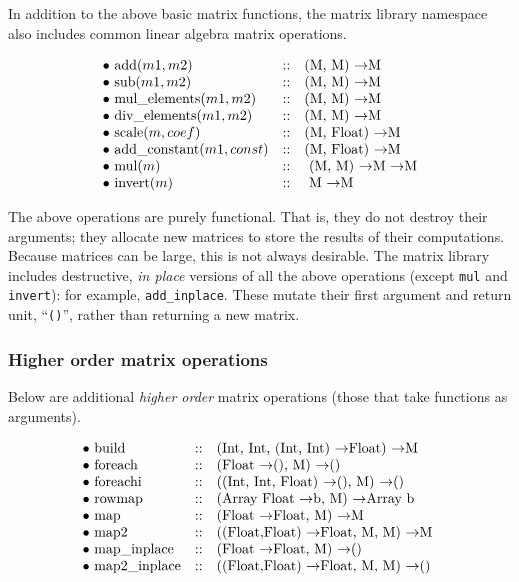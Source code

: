\documentclass[twocolumn]{report}
\newcommand{\ra}{\ensuremath{\rightarrow}}
\begin{document}
In addition to the above basic matrix functions, the matrix library
namespace also includes common linear algebra matrix operations.

\[
\begin{array}{lcl}
\bullet$ $ $add$(m1, m2)           & :: &  $(M, M)          \ra   M$ \\
\bullet$ $ $sub$(m1, m2)           & :: &  $(M, M)          \ra   M$ \\
\bullet$ $ $mul\_elements$(m1, m2) & :: &  $(M, M)          \ra   M$ \\
\bullet$ $ $div\_elements$(m1, m2) & :: &  $(M, M)          \ra   M$ \\
\bullet$ $ $scale$(m, coef)        & :: &  $(M, Float)           \ra   M$ \\
\bullet$ $ $add\_constant$(m1, const) & :: &  $(M, Float)        \ra   M$ \\
\bullet$ $ $mul$(m)                & :: &  $ (M, M) \ra M  \ra   M$ \\
\bullet$ $ $invert$(m)             & :: &  $ M                   \ra   M$ \\
\end{array}
\]

The above operations are purely functional.  That is, they do not
destroy their arguments; they allocate new matrices to store the
results of their computations.  Because matrices can be large, this is
not always desirable.  The matrix library includes destructive, {\em
in place} versions of all the above operations (except {\tt mul} and
{\tt invert}): for example, {\tt add\_inplace}.  These mutate their
first argument and return unit, ``{\tt ()}'', rather than returning a
new matrix.

\subsubsection{Higher order matrix operations}

Below are additional {\em higher order} matrix operations (those that
take functions as arguments).

\[
\begin{array}{lcl}
\bullet$ $ $build$    & :: & $(Int, Int, (Int, Int) \ra Float) \ra M  $ \\
\bullet$ $ $foreach$  & :: & $(Float \ra (), M) \ra ()   $ \\
\bullet$ $ $foreachi$     & :: & $((Int, Int, Float) \ra (), M) \ra ()   $ \\
\bullet$ $ $rowmap$       & :: & $(Array Float \ra b, M) \ra Array b     $ \\
\bullet$ $ $map$          & :: & $(Float \ra Float, M) \ra M  $ \\
\bullet$ $ $map2$         & :: & $((Float,Float) \ra Float, M, M) \ra M  $  \\
\bullet$ $ $map\_inplace$  & :: & $(Float \ra Float, M) \ra ()           $ \\
\bullet$ $ $map2\_inplace$ & :: & $((Float,Float) \ra Float, M, M) \ra ()    $\\
\end{array}
\]
\end{document}

